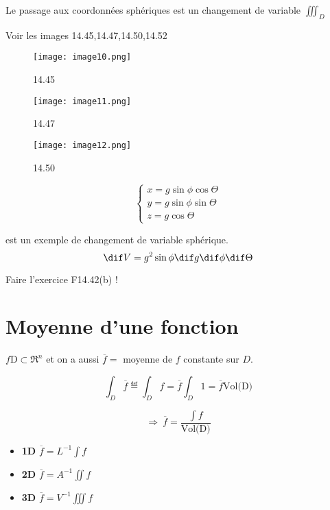 Le passage aux coordonnées sphériques est un changement de variable $\iiint_D$
\begin{myrem}

Voir les images 14.45,14.47,14.50,14.52
\begin{figure}


\texttt{[image: image10.png]}
\caption{14.45}
\end{figure}

\begin{figure}
\texttt{[image: image11.png]}
\caption{14.47}
\end{figure}

\begin{figure}
\texttt{[image: image12.png]}
\caption{14.50}
\end{figure}


\end{myrem}
$$
\left\{
\begin{array}{l}

x=g\sin\phi \cos\Theta\\
y=g\sin\phi \sin\Theta\\
z=g\cos\Theta

\end{array}
\right.
$$

est un exemple de changement de variable sphérique.
\[\dif V=g^2\sin\phi \dif g\dif\phi \dif\Theta \]

Faire l'exercice F14.42(b) !



\section{Moyenne d'une fonction}
$f\text{D} \subset \Re ^n$ et on a aussi $\overline{f} = $ moyenne de $f$ constante sur $D$.

\[\int_D \overline{f} \eqdef \int_D f = \overline{f}\int_D 1 = \overline{f}\text{Vol(D)}\]

$$\Rightarrow\ \overline{f} = \frac{\int f}{\text{Vol(D)}}$$
\begin{itemize}
\item \textbf{1D} $\overline{f}=L^{-1}\int f$
\item \textbf{2D} $\overline{f}=A^{-1}\iint f$
\item \textbf{3D} $\overline{f} = V^{-1}\iiint f$
\end{itemize}
